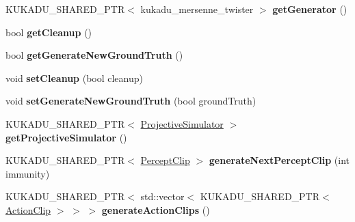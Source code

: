 \begin{DoxyCompactItemize}
\item 
K\+U\+K\+A\+D\+U\+\_\+\+S\+H\+A\+R\+E\+D\+\_\+\+P\+TR$<$ kukadu\+\_\+mersenne\+\_\+twister $>$ {\bfseries get\+Generator} ()\hypertarget{classkukadu_1_1ComplexController_a67806f5dd6b35f6f46b78556d26b945b}{}\label{classkukadu_1_1ComplexController_a67806f5dd6b35f6f46b78556d26b945b}

\item 
bool {\bfseries get\+Cleanup} ()\hypertarget{classkukadu_1_1ComplexController_a89a925da6966906ff4dcb7cc04a2ee4a}{}\label{classkukadu_1_1ComplexController_a89a925da6966906ff4dcb7cc04a2ee4a}

\item 
bool {\bfseries get\+Generate\+New\+Ground\+Truth} ()\hypertarget{classkukadu_1_1ComplexController_a2a6cb468cf7bc765e7ef1eca474166cb}{}\label{classkukadu_1_1ComplexController_a2a6cb468cf7bc765e7ef1eca474166cb}

\item 
void {\bfseries set\+Cleanup} (bool cleanup)\hypertarget{classkukadu_1_1ComplexController_ab4d925f8d6827923d02b0355414bfbea}{}\label{classkukadu_1_1ComplexController_ab4d925f8d6827923d02b0355414bfbea}

\item 
void {\bfseries set\+Generate\+New\+Ground\+Truth} (bool ground\+Truth)\hypertarget{classkukadu_1_1ComplexController_a058e59b943c1da6d7e0584e9b504302a}{}\label{classkukadu_1_1ComplexController_a058e59b943c1da6d7e0584e9b504302a}

\item 
K\+U\+K\+A\+D\+U\+\_\+\+S\+H\+A\+R\+E\+D\+\_\+\+P\+TR$<$ \hyperlink{classkukadu_1_1ProjectiveSimulator}{Projective\+Simulator} $>$ {\bfseries get\+Projective\+Simulator} ()\hypertarget{classkukadu_1_1ComplexController_a23eaaa60d29891e9f62cea576d31d6e6}{}\label{classkukadu_1_1ComplexController_a23eaaa60d29891e9f62cea576d31d6e6}

\item 
K\+U\+K\+A\+D\+U\+\_\+\+S\+H\+A\+R\+E\+D\+\_\+\+P\+TR$<$ \hyperlink{classkukadu_1_1PerceptClip}{Percept\+Clip} $>$ {\bfseries generate\+Next\+Percept\+Clip} (int immunity)\hypertarget{classkukadu_1_1ComplexController_ac986dad743a543955c0fb1871cc675d4}{}\label{classkukadu_1_1ComplexController_ac986dad743a543955c0fb1871cc675d4}

\item 
K\+U\+K\+A\+D\+U\+\_\+\+S\+H\+A\+R\+E\+D\+\_\+\+P\+TR$<$ std\+::vector$<$ K\+U\+K\+A\+D\+U\+\_\+\+S\+H\+A\+R\+E\+D\+\_\+\+P\+TR$<$ \hyperlink{classkukadu_1_1ActionClip}{Action\+Clip} $>$ $>$ $>$ {\bfseries generate\+Action\+Clips} ()\hypertarget{classkukadu_1_1ComplexController_af8e2a09a2b074fceab2765a8f710ce78}{}\label{classkukadu_1_1ComplexController_af8e2a09a2b074fceab2765a8f710ce78}


\end{DoxyCompactItemize}
